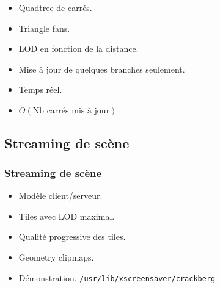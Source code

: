 \documentclass[hyperref={pdfpagelabels=false}]{beamer}
\begin{document}
\begin{frame}
\begin{figure}[h]
  \end{figure}
  \begin{itemize}
  \item Quadtree de carrés.
  \item Triangle fans.
  \item LOD en fonction de la distance.
  \item Mise à jour de quelques branches seulement.
  \item Temps réel.
  \item $\tilde O(\text{Nb carrés mis à jour})$
  \end{itemize}
\end{frame}

\subsection{Streaming de scène}
\begin{frame}
  \frametitle{Streaming de scène}
  \begin{itemize}
  \item Modèle client/serveur.
  \item Tiles avec LOD maximal.
  \item Qualité progressive des tiles.
  \item Geometry clipmaps.
  \item Démonstration. {\tiny\texttt{/usr/lib/xscreensaver/crackberg}}
  \end{itemize}
\end{frame}


\end{document}
